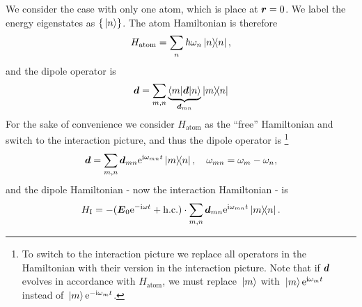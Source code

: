 \documentclass[hyperref, a4paper]{article}
\newcommand*{\ii}{\mathrm{i}}
\newcommand*{\ee}{\mathrm{e}}
\begin{document}
We consider the case with only one atom, which is place at $\vb*{r} = 0$.
We label the energy eigenstates as $\{\ket*{n}\}$. The atom Hamiltonian is therefore 
\begin{equation}
    H_\text{atom} = \sum_n \hbar \omega_n \dyad{n},
\end{equation}
and the dipole operator is 
\begin{equation}
    \vb*{d} = \sum_{m, n} \underbrace{\mel**{m}{\vb*{d}}{n}}_{\vb*{d}_{mn}} \dyad{m}{n}
\end{equation}
For the sake of convenience we consider $H_\text{atom}$ as the ``free'' Hamiltonian and switch to the interaction picture, and thus the dipole operator is%
\footnote{
    To switch to the interaction picture we replace all operators in the Hamiltonian with their version in the interaction picture.
    Note that if $\vb*{d}$ evolves in accordance with $H_\text{atom}$, we must replace $\ket*{m}$ with $\ket*{m} \ee^{\ii \omega_m t}$ instead of $\ket*{m} \ee^{-\ii \omega_m t}$.
}%
\begin{equation}
    \vb*{d} = \sum_{m, n} \vb*{d}_{mn} \ee^{\ii \omega_{mn} t} \dyad{m}{n}, \quad \omega_{mn} = \omega_m - \omega_n,
    \label{eq:dipole-interaction-picture}
\end{equation}
and the dipole Hamiltonian - now the interaction Hamiltonian - is 
\begin{equation}
    H_\text{I} = - (\vb*{E}_0 \ee^{- \ii \omega t} + \text{h.c.}) \cdot \sum_{m, n} \vb*{d}_{mn} \ee^{\ii \omega_{mn} t} \dyad{m}{n}.
\end{equation}
\end{document}
